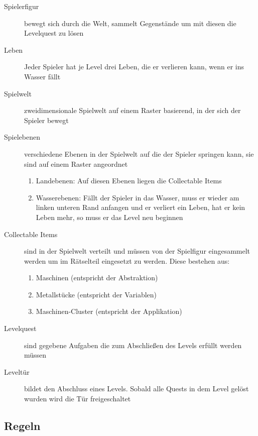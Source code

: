\documentclass{scrartcl}
\begin{document}
\begin{description}
	\item[Spielerfigur] bewegt sich durch die Welt, sammelt Gegenstände um mit diesen die Levelquest zu lösen
	\item[Leben] Jeder Spieler hat je Level drei Leben, die er verlieren kann, wenn er ins Wasser fällt
	\item[Spielwelt] zweidimensionale Spielwelt auf einem Raster basierend, in der sich der Spieler bewegt
	\item[Spielebenen] verschiedene Ebenen in der Spielwelt auf die der Spieler springen kann, sie sind auf einem Raster angeordnet
		\begin{enumerate}[label=\arabic*]
			\item Landebenen: Auf diesen Ebenen liegen die Collectable Items
			\item Wasserebenen: Fällt der Spieler in das Wasser, muss er wieder am linken unteren Rand anfangen und er verliert ein Leben, hat er kein Leben mehr, so muss er das Level neu beginnen
		\end{enumerate}
	\item[Collectable Items] \label{elemente:collectable}sind in der Spielwelt verteilt und müssen von der Spielfigur eingesammelt werden um im Rätselteil eingesetzt zu werden. Diese bestehen aus:
	\begin{enumerate}[label=\arabic*]
		\item Maschinen (entspricht der Abstraktion)
		\item Metallstücke (entspricht der Variablen)
		\item Maschinen-Cluster (entspricht der Applikation)
	\end{enumerate}
	\item[Levelquest] sind gegebene Aufgaben die zum Abschließen des Levels erfüllt werden müssen
	\item[Leveltür] bildet den Abschluss eines Levels. Sobald alle Quests in dem Level gelöst wurden wird die Tür freigeschaltet
\end{description}

\subsection{Regeln}
\end{document}
